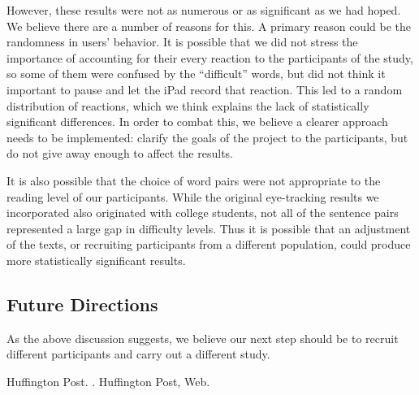\documentclass[11pt,letterpaper]{article}
\begin{document}
	However, these results were not as numerous or as significant as we had hoped. We believe there are a number of reasons for this. A primary reason could be the randomness in users' behavior. It is possible that we did not stress the importance of accounting for their every reaction to the participants of the study, so some of them were confused by the ``difficult'' words, but did not think it important to pause and let the iPad record that reaction. This led to a random distribution of reactions, which we think explains the lack of statistically significant differences. In order to combat this, we believe a clearer approach needs to be implemented: clarify the goals of the project to the participants, but do not give away enough to affect the results.
	
	It is also possible that the choice of word pairs were not appropriate to the reading level of our participants. While the original eye-tracking results we incorporated also originated with college students, not all of the sentence pairs represented a large gap in difficulty levels. Thus it is possible that an adjustment of the texts, or recruiting participants from a different population, could produce more statistically significant results.
	
	\subsection{Future Directions}
	
	As the above discussion suggests, we believe our next step should be to recruit different participants and carry out a different study. 
	
%	
	
	\begin{thebibliography}{}
		
		{Huffington Post}.
		.
		\newblock Huffington Post, Web.
		
	\end{thebibliography}
	
\end{document}
